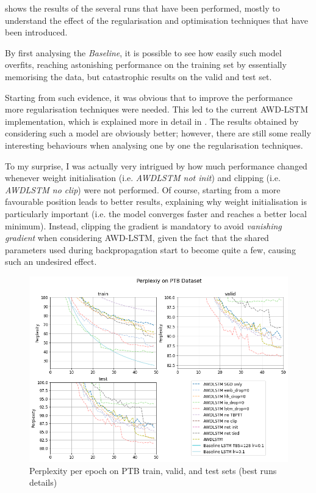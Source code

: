  shows the results of the several runs that have been performed, mostly to understand the effect of the regularisation and optimisation techniques that have been introduced.

By first analysing the \textit{Baseline}, it is possible to see how easily such model overfits, reaching astonishing performance on the training set by essentially memorising the data, but catastrophic results on the valid and test set. 

Starting from such evidence, it was obvious that to improve the performance more regularisation techniques were needed. This led to the current AWD-LSTM implementation, which is explained more in detail in . The results obtained by considering such a model are obviously better; however, there are still some really interesting behaviours when analysing one by one the regularisation techniques.

To my surprise, I was actually very intrigued by how much performance changed whenever weight initialisation (i.e. \textit{AWDLSTM not init}) and clipping (i.e. \textit{AWDLSTM no clip}) were not performed. Of course, starting from a more favourable position leads to better results, explaining why weight initialisation is particularly important (i.e. the model converges faster and reaches a better local minimum). Instead, clipping the gradient is mandatory to avoid \textit{vanishing gradient} when considering AWD-LSTM, given the fact that the shared parameters used during backpropagation start to become quite a few, causing such an undesired effect.

\begin{figure}
    \centering
    \includegraphics[scale=0.28]{assets/run_results_zoom_in.png}
    \vspace{-1.5em}
    \caption{Perplexity per epoch on PTB train, valid, and test sets (best runs details)}
    \vspace{-1.5em}
    \label{fig:results-zoom}
\end{figure}

